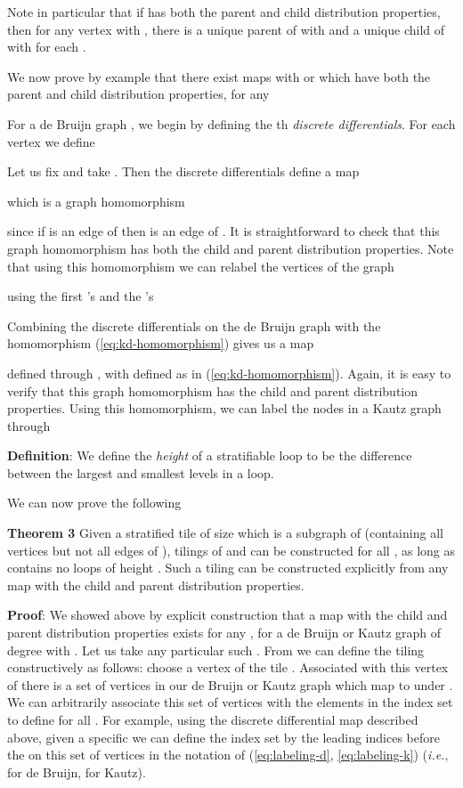 \documentclass[12pt]{article}
\begin{document}
Note in particular that if  has both
the parent and child distribution properties, then for any vertex  with , there is a unique parent  of  with  and a unique child
 of  with  for each .
\vspace*{0.1in}

We now prove by example that there exist maps 
 with
 or  which have both the parent and child
distribution properties, for any 


For a de Bruijn graph , we begin by defining the th
{\it discrete 
differentials}.  For each vertex  we define

Let us fix   and take .
Then the discrete 
differentials define a map

which is a graph homomorphism

since if  is an edge of  then  is an
  edge of .
It is straightforward to check that this graph homomorphism has both
  the child and parent distribution properties.   
Note that using this homomorphism we can relabel the vertices of the graph
 
  using the first  's and the 's


Combining the discrete differentials on the de Bruijn graph
 with the homomorphism
(\ref{eq:kd-homomorphism}) 
gives us a map 

defined through , with  defined as in
(\ref{eq:kd-homomorphism}).  
Again, it is easy to
verify that this graph homomorphism has the child and parent
distribution properties.
Using this homomorphism, we
can label the nodes in a Kautz graph
 through

\vspace*{0.1in}

\noindent
{\bf Definition}: We define the {\it height} of a stratifiable loop
 to be the difference 
between the largest and smallest levels in a loop.
\vspace*{0.1in}

We can now prove the following
\vspace*{0.1in}

\noindent
{\bf Theorem 3} Given a stratified tile  of size  which is a
subgraph of  (containing all vertices but not all
edges
of  ), tilings of  and  can be constructed for all ,
as long as  contains no loops of height .
Such a tiling can be constructed explicitly from any map
 with the child and parent distribution properties.


\vspace*{0.1in}
\noindent
{\bf Proof}: We showed above by explicit construction that a map
 with the child and parent distribution
properties exists for any , for  a de Bruijn or Kautz graph of
degree  with .  Let us take any particular such .
From  we can define the tiling constructively as follows: choose
a vertex  of the tile .  Associated with
this vertex of  there is a set of vertices in our de Bruijn or
Kautz graph  which map to  under .  We can arbitrarily
associate this set of vertices with the elements  in the index set
 to define  for all .  For example, using the
discrete differential map described above, given a specific  we can define the index set by the leading indices before
the  on this set of vertices in the notation of
(\ref{eq:labeling-d}, \ref{eq:labeling-k}) ({\it i.e.},  for de Bruijn,  for Kautz).  
\end{document}

